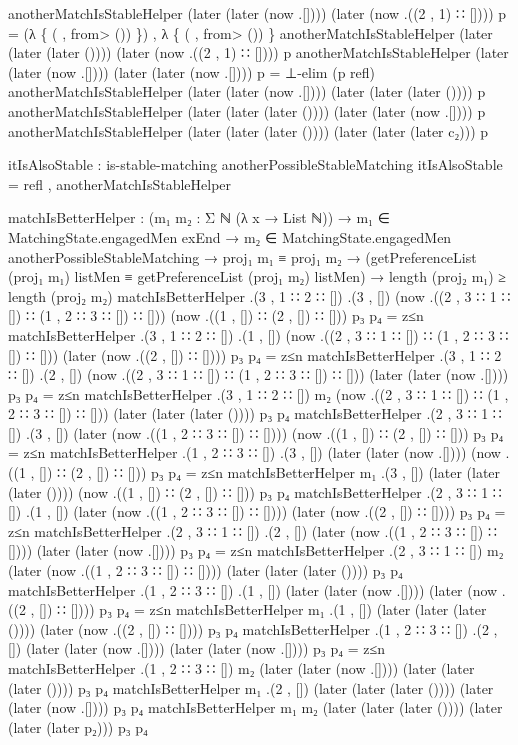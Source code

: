 \documentclass{article}
\begin{document}
\begin{code}
{anotherMatchIsStableHelper \AgdaUnderscore{} \AgdaUnderscore{} (later (later (now .[]))) (later (now .((2 , 1) ∷ []))) p = (λ \{ (\AgdaUnderscore{} , \AgdaUnderscore{}from>\AgdaUnderscore{} ()) \}) , λ \{ (\AgdaUnderscore{} , \AgdaUnderscore{}from>\AgdaUnderscore{} ()) \}
anotherMatchIsStableHelper \AgdaUnderscore{} \AgdaUnderscore{} (later (later (later ()))) (later (now .((2 , 1) ∷ []))) p
anotherMatchIsStableHelper \AgdaUnderscore{} \AgdaUnderscore{} (later (later (now .[]))) (later (later (now .[]))) p = ⊥-elim (p refl)
anotherMatchIsStableHelper \AgdaUnderscore{} \AgdaUnderscore{} (later (later (now .[]))) (later (later (later ()))) p
anotherMatchIsStableHelper \AgdaUnderscore{} \AgdaUnderscore{} (later (later (later ()))) (later (later (now .[]))) p
anotherMatchIsStableHelper \AgdaUnderscore{} \AgdaUnderscore{} (later (later (later ()))) (later (later (later c₂))) p

itIsAlsoStable : is-stable-matching anotherPossibleStableMatching
itIsAlsoStable = refl , anotherMatchIsStableHelper

matchIsBetterHelper : (m₁ m₂ : Σ ℕ (λ x → List ℕ)) → m₁ ∈ MatchingState.engagedMen exEnd → m₂ ∈ MatchingState.engagedMen anotherPossibleStableMatching → proj₁ m₁ ≡ proj₁ m₂ →
      (getPreferenceList (proj₁ m₁) listMen
      ≡
      getPreferenceList (proj₁ m₂) listMen)
      →
      length (proj₂ m₁) ≥ length (proj₂ m₂)
matchIsBetterHelper .(3 , 1 ∷ 2 ∷ []) .(3 , []) (now .((2 , 3 ∷ 1 ∷ []) ∷ (1 , 2 ∷ 3 ∷ []) ∷ [])) (now .((1 , []) ∷ (2 , []) ∷ [])) p₃ p₄ = z≤n
matchIsBetterHelper .(3 , 1 ∷ 2 ∷ []) .(1 , []) (now .((2 , 3 ∷ 1 ∷ []) ∷ (1 , 2 ∷ 3 ∷ []) ∷ [])) (later (now .((2 , []) ∷ []))) p₃ p₄ = z≤n
matchIsBetterHelper .(3 , 1 ∷ 2 ∷ []) .(2 , []) (now .((2 , 3 ∷ 1 ∷ []) ∷ (1 , 2 ∷ 3 ∷ []) ∷ [])) (later (later (now .[]))) p₃ p₄ = z≤n
matchIsBetterHelper .(3 , 1 ∷ 2 ∷ []) m₂ (now .((2 , 3 ∷ 1 ∷ []) ∷ (1 , 2 ∷ 3 ∷ []) ∷ [])) (later (later (later ()))) p₃ p₄
matchIsBetterHelper .(2 , 3 ∷ 1 ∷ []) .(3 , []) (later (now .((1 , 2 ∷ 3 ∷ []) ∷ []))) (now .((1 , []) ∷ (2 , []) ∷ [])) p₃ p₄ = z≤n
matchIsBetterHelper .(1 , 2 ∷ 3 ∷ []) .(3 , []) (later (later (now .[]))) (now .((1 , []) ∷ (2 , []) ∷ [])) p₃ p₄ = z≤n
matchIsBetterHelper m₁ .(3 , []) (later (later (later ()))) (now .((1 , []) ∷ (2 , []) ∷ [])) p₃ p₄
matchIsBetterHelper .(2 , 3 ∷ 1 ∷ []) .(1 , []) (later (now .((1 , 2 ∷ 3 ∷ []) ∷ []))) (later (now .((2 , []) ∷ []))) p₃ p₄ = z≤n
matchIsBetterHelper .(2 , 3 ∷ 1 ∷ []) .(2 , []) (later (now .((1 , 2 ∷ 3 ∷ []) ∷ []))) (later (later (now .[]))) p₃ p₄ = z≤n
matchIsBetterHelper .(2 , 3 ∷ 1 ∷ []) m₂ (later (now .((1 , 2 ∷ 3 ∷ []) ∷ []))) (later (later (later ()))) p₃ p₄
matchIsBetterHelper .(1 , 2 ∷ 3 ∷ []) .(1 , []) (later (later (now .[]))) (later (now .((2 , []) ∷ []))) p₃ p₄ = z≤n
matchIsBetterHelper m₁ .(1 , []) (later (later (later ()))) (later (now .((2 , []) ∷ []))) p₃ p₄
matchIsBetterHelper .(1 , 2 ∷ 3 ∷ []) .(2 , []) (later (later (now .[]))) (later (later (now .[]))) p₃ p₄ = z≤n
matchIsBetterHelper .(1 , 2 ∷ 3 ∷ []) m₂ (later (later (now .[]))) (later (later (later ()))) p₃ p₄
matchIsBetterHelper m₁ .(2 , []) (later (later (later ()))) (later (later (now .[]))) p₃ p₄
matchIsBetterHelper m₁ m₂ (later (later (later ()))) (later (later (later p₂))) p₃ p₄

}
\end{code}
\end{document}
